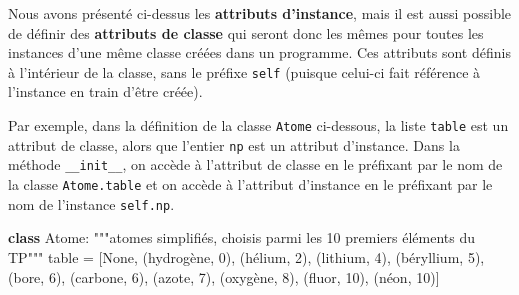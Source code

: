 \documentclass[
  french,
  letterpaper,
  DIV=11,
  numbers=noendperiod]{scrartcl}
\newenvironment{Shaded}{\begin{snugshade}}{\end{snugshade}}
\newcommand{\CommentTok}[1]{\textcolor[rgb]{0.37,0.37,0.37}{#1}}
\newcommand{\DecValTok}[1]{\textcolor[rgb]{0.68,0.00,0.00}{#1}}
\newcommand{\KeywordTok}[1]{\textcolor[rgb]{0.00,0.23,0.31}{\textbf{#1}}}
\newcommand{\NormalTok}[1]{\textcolor[rgb]{0.00,0.23,0.31}{#1}}
\newcommand{\OperatorTok}[1]{\textcolor[rgb]{0.37,0.37,0.37}{#1}}
\newcommand{\StringTok}[1]{\textcolor[rgb]{0.13,0.47,0.30}{#1}}
\newcommand{\VariableTok}[1]{\textcolor[rgb]{0.07,0.07,0.07}{#1}}
\begin{document}
\begin{tcolorbox}[enhanced jigsaw, breakable, title=\textcolor{quarto-callout-note-color}{\faInfo}\hspace{0.5em}{Remarque}, toptitle=1mm, coltitle=black, colback=white, left=2mm, colbacktitle=quarto-callout-note-color!10!white, opacityback=0, opacitybacktitle=0.6, bottomtitle=1mm, colframe=quarto-callout-note-color-frame, bottomrule=.15mm, rightrule=.15mm, arc=.35mm, titlerule=0mm, toprule=.15mm, leftrule=.75mm]

Nous avons présenté ci-dessus les \textbf{attributs d'instance}, mais il
est aussi possible de définir des \textbf{attributs de classe} qui
seront donc les mêmes pour toutes les instances d'une même classe créées
dans un programme. Ces attributs sont définis à l'intérieur de la
classe, sans le préfixe \texttt{self} (puisque celui-ci fait référence à
l'instance en train d'être créée).

Par exemple, dans la définition de la classe \texttt{Atome} ci-dessous,
la liste \texttt{table} est un attribut de classe, alors que l'entier
\texttt{np} est un attribut d'instance. Dans la méthode
\texttt{\_\_init\_\_}, on accède à l'attribut de classe en le préfixant
par le nom de la classe \texttt{Atome.table} et on accède à l'attribut
d'instance en le préfixant par le nom de l'instance \texttt{self.np}.

\begin{Shaded}
\begin{Highlighting}[]
\KeywordTok{class}\NormalTok{ Atome:}
\CommentTok{"""atomes simplifiés, choisis parmi les 10 premiers éléments du TP"""}
\NormalTok{table }\OperatorTok{=}\NormalTok{ [}\VariableTok{None}\NormalTok{, (}\StringTok{\textquotesingle{}hydrogène\textquotesingle{}}\NormalTok{, }\DecValTok{0}\NormalTok{), (}\StringTok{\textquotesingle{}hélium\textquotesingle{}}\NormalTok{, }\DecValTok{2}\NormalTok{), (}\StringTok{\textquotesingle{}lithium\textquotesingle{}}\NormalTok{, }\DecValTok{4}\NormalTok{), (}\StringTok{\textquotesingle{}béryllium\textquotesingle{}}\NormalTok{, }\DecValTok{5}\NormalTok{),}
\NormalTok{            (}\StringTok{\textquotesingle{}bore\textquotesingle{}}\NormalTok{, }\DecValTok{6}\NormalTok{), (}\StringTok{\textquotesingle{}carbone\textquotesingle{}}\NormalTok{, }\DecValTok{6}\NormalTok{), (}\StringTok{\textquotesingle{}azote\textquotesingle{}}\NormalTok{, }\DecValTok{7}\NormalTok{), (}\StringTok{\textquotesingle{}oxygène\textquotesingle{}}\NormalTok{, }\DecValTok{8}\NormalTok{), (}\StringTok{\textquotesingle{}fluor\textquotesingle{}}\NormalTok{, }\DecValTok{10}\NormalTok{), (}\StringTok{\textquotesingle{}néon\textquotesingle{}}\NormalTok{, }\DecValTok{10}\NormalTok{)]}


\end{Highlighting}
\end{Shaded}
\end{tcolorbox}
\end{document}

